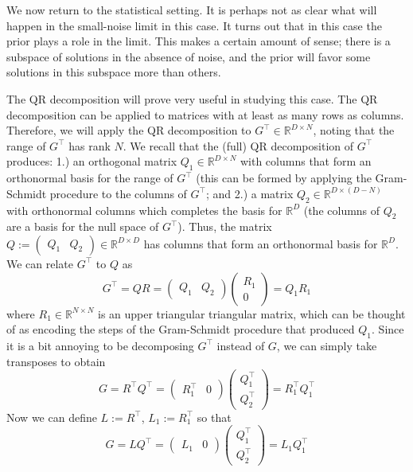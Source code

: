 \documentclass[12pt]{article}
\newcommand{\R}{\mathbb{R}}
\begin{document}
We now return to the statistical setting. It is perhaps not as clear what will happen in the small-noise limit in this case. 
It turns out that in this case the prior plays a role in the limit. This makes a certain amount of sense; 
there is a subspace of solutions in the absence of noise, and the prior will favor some solutions in this subspace more than others. 

The QR decomposition will prove very useful in studying this case. The QR decomposition 
can be applied to matrices with at least as many rows as columns. Therefore, we will apply the QR decomposition to $G^{\top} \in \R^{D \times N}$, noting that 
the range of $G^{\top}$ has rank $N$. 
We recall that the (full) QR decomposition of $G^{\top}$ produces: 1.) an orthogonal matrix $Q_1 \in \R^{D \times N}$ with columns 
that form an orthonormal basis for the range of $G^{\top}$ (this can be formed by applying the Gram-Schmidt procedure to the columns of $G^{\top}$; and 2.) a matrix 
$Q_2 \in \R^{D \times (D - N)}$ with orthonormal columns which completes the basis for $\R^D$ (the columns of $Q_2$ are a basis for the null space of $G^{\top}$). 
Thus, the matrix $Q := \begin{pmatrix} Q_1 & Q_2 \end{pmatrix} \in \R^{D \times D}$ has columns that form an orthonormal basis for $\R^D$. We can relate $G^{\top}$ 
to $Q$ as 
\[
G^{\top} = QR = \begin{pmatrix} Q_1 & Q_2 \end{pmatrix} \begin{pmatrix} R_1 \\ 0 \end{pmatrix} = Q_1 R_1
\]
where $R_1 \in \R^{N \times N}$ is an upper triangular triangular matrix, which can be thought of as encoding the steps of the Gram-Schmidt procedure that produced 
$Q_1$. Since it is a bit annoying to be decomposing $G^{\top}$ instead of $G$, we can simply take transposes to obtain 
\[
G = R^{\top} Q^{\top} = \begin{pmatrix} R_1^{\top} & 0 \end{pmatrix}  \begin{pmatrix} Q_1^{\top} \\ Q_2^{\top} \end{pmatrix} = R^{\top}_1 Q^{\top}_1 
\]
Now we can define $L := R^{\top}$, $L_1 := R_1^{\top}$ so that 
\[
G = L Q^{\top} = \begin{pmatrix} L_1 & 0 \end{pmatrix}  \begin{pmatrix} Q_1^{\top} \\ Q_2^{\top} \end{pmatrix} = L_1 Q^{\top}_1 
\]
\end{document}
